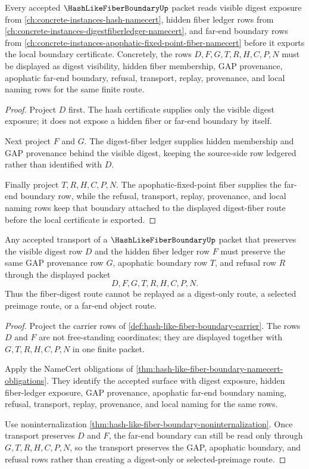\begin{theorem}
\label{thm:hashlikefiberboundary-sibling-route}
Every accepted $\HashLikeFiberBoundaryUp$ packet reads visible digest exposure
from \autoref{ch:concrete-instances-hash-namecert}, hidden fiber ledger rows
from \autoref{ch:concrete-instances-digestfiberledger-namecert}, and far-end
boundary rows from
\autoref{ch:concrete-instances-apophatic-fixed-point-fiber-namecert} before it
exports the local boundary certificate. Concretely, the rows $D,F,G,T,R,H,C,P,N$
must be displayed as digest visibility, hidden fiber membership, GAP
provenance, apophatic far-end boundary, refusal, transport, replay, provenance,
and local naming rows for the same finite route.
\end{theorem}
\begin{proof}
Project $D$ first. The hash certificate supplies only the visible digest
exposure; it does not expose a hidden fiber or far-end boundary by itself.

Next project $F$ and $G$. The digest-fiber ledger supplies hidden membership
and GAP provenance behind the visible digest, keeping the source-side row
ledgered rather than identified with $D$.

Finally project $T,R,H,C,P,N$. The apophatic-fixed-point fiber supplies the
far-end boundary row, while the refusal, transport, replay, provenance, and
local naming rows keep that boundary attached to the displayed digest-fiber
route before the local certificate is exported.
\end{proof}

\begin{theorem}
\label{thm:hashlikefiberboundary-fiber-digest-stability}
Any accepted transport of a $\HashLikeFiberBoundaryUp$ packet that preserves the
visible digest row $D$ and the hidden fiber ledger row $F$ must preserve the
same GAP provenance row $G$, apophatic boundary row $T$, and refusal row $R$
through the displayed packet
$$
D,F,G,T,R,H,C,P,N.
$$
Thus the fiber-digest route cannot be replayed as a digest-only route, a
selected preimage route, or a far-end object route.
\end{theorem}
\begin{proof}
Project the carrier rows of
\autoref{def:hash-like-fiber-boundary-carrier}. The rows $D$ and $F$ are not
free-standing coordinates; they are displayed together with $G,T,R,H,C,P,N$ in
one finite packet.

Apply the NameCert obligations of
\autoref{thm:hash-like-fiber-boundary-namecert-obligations}. They identify the
accepted surface with digest exposure, hidden fiber-ledger exposure, GAP
provenance, apophatic far-end boundary naming, refusal, transport, replay,
provenance, and local naming for the same rows.

Use noninternalization
\autoref{thm:hash-like-fiber-boundary-noninternalization}. Once transport
preserves $D$ and $F$, the far-end boundary can still be read only through
$G,T,R,H,C,P,N$, so the transport preserves the GAP, apophatic boundary, and
refusal rows rather than creating a digest-only or selected-preimage route.
\end{proof}

